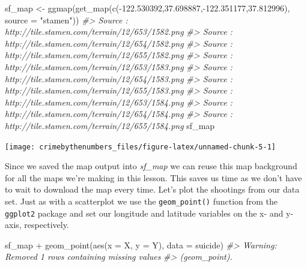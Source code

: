 \documentclass[
]{krantz}
\makeatletter
\newenvironment{Shaded}{\begin{snugshade}}{\end{snugshade}}
\newcommand{\AttributeTok}[1]{\textcolor[rgb]{0.61,0.61,0.61}{#1}}
\newcommand{\CommentTok}[1]{\textcolor[rgb]{0.37,0.37,0.37}{\textit{#1}}}
\newcommand{\FloatTok}[1]{\textcolor[rgb]{0.06,0.06,0.06}{#1}}
\newcommand{\FunctionTok}[1]{\textcolor[rgb]{0,0,0}{#1}}
\newcommand{\NormalTok}[1]{#1}
\newcommand{\OtherTok}[1]{\textcolor[rgb]{0.37,0.37,0.37}{#1}}
\newcommand{\SpecialCharTok}[1]{\textcolor[rgb]{0,0,0}{#1}}
\newcommand{\StringTok}[1]{\textcolor[rgb]{0.5,0.5,0.5}{#1}}
\newenvironment{kframe}{%
\medskip{}
\setlength{\fboxsep}{.8em}
 \def\at@end@of@kframe{}%
 \ifinner\ifhmode%
  \def\at@end@of@kframe{\end{minipage}}%
  \begin{minipage}{\columnwidth}%
 \fi\fi%
 \def\FrameCommand##1{\hskip\@totalleftmargin \hskip-\fboxsep
 \colorbox{shadecolor}{##1}\hskip-\fboxsep
     \hskip-\linewidth \hskip-\@totalleftmargin \hskip\columnwidth}%
 \MakeFramed {\advance\hsize-\width
   \@totalleftmargin\z@ \linewidth\hsize
   \@setminipage}}%
 {\par\unskip\endMakeFramed%
 \at@end@of@kframe}
\renewenvironment{Shaded}{\begin{kframe}}{\end{kframe}}
\makeatother
\begin{document}
\begin{Shaded}
\begin{Highlighting}[]
\NormalTok{sf\_map }\OtherTok{\textless{}{-}} \FunctionTok{ggmap}\NormalTok{(}\FunctionTok{get\_map}\NormalTok{(}\FunctionTok{c}\NormalTok{(}\SpecialCharTok{{-}}\FloatTok{122.530392}\NormalTok{,}\FloatTok{37.698887}\NormalTok{,}\SpecialCharTok{{-}}\FloatTok{122.351177}\NormalTok{,}\FloatTok{37.812996}\NormalTok{), }
                            \AttributeTok{source =} \StringTok{"stamen"}\NormalTok{))}
\CommentTok{\#\textgreater{} Source : http://tile.stamen.com/terrain/12/653/1582.png}
\CommentTok{\#\textgreater{} Source : http://tile.stamen.com/terrain/12/654/1582.png}
\CommentTok{\#\textgreater{} Source : http://tile.stamen.com/terrain/12/655/1582.png}
\CommentTok{\#\textgreater{} Source : http://tile.stamen.com/terrain/12/653/1583.png}
\CommentTok{\#\textgreater{} Source : http://tile.stamen.com/terrain/12/654/1583.png}
\CommentTok{\#\textgreater{} Source : http://tile.stamen.com/terrain/12/655/1583.png}
\CommentTok{\#\textgreater{} Source : http://tile.stamen.com/terrain/12/653/1584.png}
\CommentTok{\#\textgreater{} Source : http://tile.stamen.com/terrain/12/654/1584.png}
\CommentTok{\#\textgreater{} Source : http://tile.stamen.com/terrain/12/655/1584.png}
\NormalTok{sf\_map}
\end{Highlighting}
\end{Shaded}

\begin{center}\texttt{[image: crimebythenumbers\_files/figure-latex/unnamed-chunk-5-1]} \end{center}

Since we saved the map output into \emph{sf\_map} we can reuse this map background for all the maps we're making in this lesson. This saves us time as we don't have to wait to download the map every time. Let's plot the shootings from our data set. Just as with a scatterplot we use the \texttt{geom\_point()} function from the \texttt{ggplot2} package and set our longitude and latitude variables on the x- and y-axis, respectively.

\begin{Shaded}
\begin{Highlighting}[]
\NormalTok{sf\_map }\SpecialCharTok{+}
  \FunctionTok{geom\_point}\NormalTok{(}\FunctionTok{aes}\NormalTok{(}\AttributeTok{x =}\NormalTok{ X, }\AttributeTok{y =}\NormalTok{ Y),}
             \AttributeTok{data  =}\NormalTok{ suicide)}
\CommentTok{\#\textgreater{} Warning: Removed 1 rows containing missing values}
\CommentTok{\#\textgreater{} (geom\_point).}
\end{Highlighting}
\end{Shaded}
\end{document}
